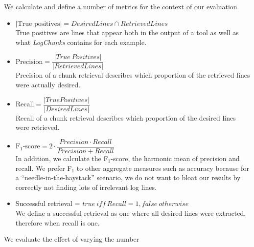 We calculate and define a number of metrics for the context of our
evaluation.

\vspace{0.2cm}
\begin{itemize}[leftmargin=0.4cm] \itemsep1em
	\item $|\mbox{True positives}| = \mathit{DesiredLines} \cap
	\mathit{RetrievedLines}$ \vspace{0.2cm}\\
	True positives are lines that appear both in the output of a
	tool as well as what \textit{LogChunks} contains for each
	example.

	\item $\mbox{Precision} = \dfrac{|\mathit{True\
	Positives}|}{|\mathit{RetrievedLines}|}$ \vspace{0.21cm} \\
	Precision of a chunk retrieval describes which proportion of
	the retrieved lines were actually desired.

	\item $\mbox{Recall} =
	\dfrac{|\mathit{TruePositives}|}{|\mathit{DesiredLines}|}$
	\vspace{0.2cm} \\
	Recall of a chunk retrieval describes which proportion of the
	desired lines were retrieved.
	\item $\mbox{F$_{1}$-score} = 2 \cdot \dfrac{\mathit{Precision}
	\cdot \mathit{Recall}}{\mathit{Precision} + \mathit{Recall}}$
	\vspace{0.2cm}\\
	In addition, we calculate the F$_{1}$-score, the harmonic mean
	of precision and recall.
We prefer F$_{1}$ to other aggregate
	measures such as accuracy because for a
	``needle-in-the-haystack'' scenario, we do not want to bloat
	our results by correctly not finding lots of irrelevant log
	lines.
	\item Successful retrieval = $\mathit{true}\ \mathit{iff}\
	\mathit{Recall} = 1, \mathit{false\ otherwise}$  \vspace{0.2cm} \\
	We define a successful retrieval as one where all desired
	lines were
	extracted, therefore when recall is one.
\end{itemize}

We evaluate the effect of varying the number

